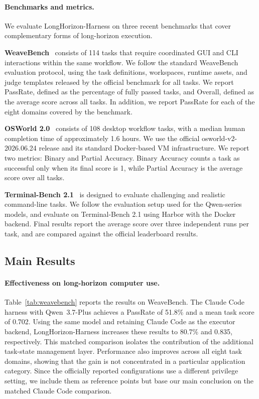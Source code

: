 \paragraph{Benchmarks and metrics.}
We evaluate LongHorizon-Harness on three recent benchmarks that cover complementary forms of long-horizon execution.

\textbf{WeaveBench}~\cite{weavebench} consists of 114 tasks that require coordinated GUI and CLI interactions within the same workflow. We follow the standard WeaveBench evaluation protocol, using the task definitions, workspaces, runtime assets, and judge templates released by the official benchmark for all tasks. We report PassRate, defined as the percentage of fully passed tasks, and Overall, defined as the average score across all tasks. In addition, we report PassRate for each of the eight domains covered by the benchmark.


\textbf{OSWorld 2.0}~\cite{osworld2} consists of 108 desktop workflow tasks, with a median human completion time of approximately 1.6 hours. We use the official osworld-v2-2026.06.24 release and its standard Docker-based VM infrastructure. We report two metrics: Binary and Partial Accuracy. Binary Accuracy counts a task as successful only when its final score is 1, while Partial Accuracy is the average score over all tasks.


\textbf{Terminal-Bench 2.1}~\cite{terminalbench} is designed to evaluate challenging and realistic command-line tasks. We follow the evaluation setup used for the Qwen-series models, and evaluate on Terminal-Bench 2.1 using Harbor with the Docker backend. Final results report the average score over three independent runs per task, and are compared against the official leaderboard results.



\subsection{Main Results}
\label{sec:exp-results}

\paragraph{Effectiveness on long-horizon computer use.}
Table~\ref{tab:weavebench} reports the results on WeaveBench. The Claude Code harness with Qwen~3.7-Plus achieves a PassRate of 51.8\% and a mean task score of 0.702. Using the same model and retaining Claude Code as the executor backend, LongHorizon-Harness increases these results to 80.7\% and 0.835, respectively. This matched comparison isolates the contribution of the additional task-state management layer. Performance also improves across all eight task domains, showing that the gain is not concentrated in a particular application category. Since the officially reported configurations use a different privilege setting, we include them as reference points but base our main conclusion on the matched Claude Code comparison.

